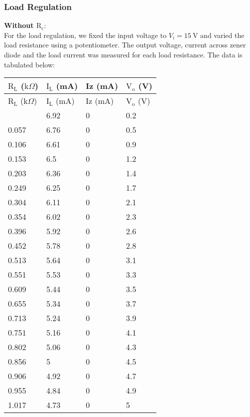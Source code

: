 \documentclass{scrartcl}
\begin{document}
\subsubsection{Load Regulation}
\textbf{Without $\mathrm{R_c}:$ }\\[0.3cm]
For the load regulation, we fixed the input voltage to $V_i = 15 \ \mathrm{V}$ and varied the load resistance using a potentiometer. The output voltage, current across zener diode and the load current was measured for each load resistance. The data is tabulated below:

\begin{longtable}{|l|l|l|l|}
\hline
$\mathrm{R_L}$ ($\mathrm{k}\Omega$) & $\mathrm{I_L}$ (mA) & Iz (mA) & $\mathrm{V_o}$ (V) \\ \hline
\endfirsthead
\hline
$\mathrm{R_L}$ ($\mathrm{k}\Omega$) & $\mathrm{I_L}$ (mA) & Iz (mA) & $\mathrm{V_o}$ (V) \\ \hline
\endhead
\hline
\endfoot
\hline
\endlastfoot
0.007       & 6.92      & 0       & 0.2       \\ \hline
0.057       & 6.76      & 0       & 0.5       \\ \hline
0.106       & 6.61      & 0       & 0.9       \\ \hline
0.153       & 6.5       & 0       & 1.2       \\ \hline
0.203       & 6.36      & 0       & 1.4       \\ \hline
0.249       & 6.25      & 0       & 1.7       \\ \hline
0.304       & 6.11      & 0       & 2.1       \\ \hline
0.354       & 6.02      & 0       & 2.3       \\ \hline
0.396       & 5.92      & 0       & 2.6       \\ \hline
0.452       & 5.78      & 0       & 2.8       \\ \hline
0.513       & 5.64      & 0       & 3.1       \\ \hline
0.551       & 5.53      & 0       & 3.3       \\ \hline
0.609       & 5.44      & 0       & 3.5       \\ \hline
0.655       & 5.34      & 0       & 3.7       \\ \hline
0.713       & 5.24      & 0       & 3.9       \\ \hline
0.751       & 5.16      & 0       & 4.1       \\ \hline
0.802       & 5.06      & 0       & 4.3       \\ \hline
0.856       & 5         & 0       & 4.5       \\ \hline
0.906       & 4.92      & 0       & 4.7       \\ \hline
0.955       & 4.84      & 0       & 4.9       \\ \hline
1.017       & 4.73      & 0       & 5         \\ \hline
\end{longtable}
\end{document}
